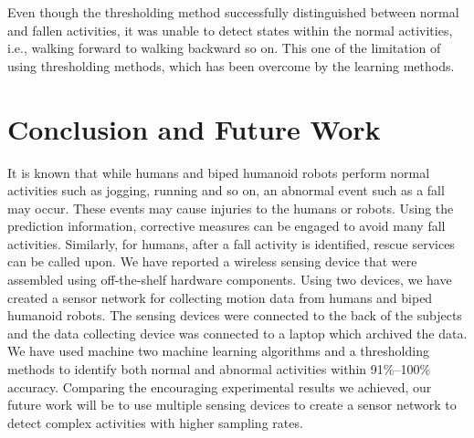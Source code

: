 \documentclass[letterpaper]{article}
\begin{document}
\begin{sloppy}
Even though the thresholding method successfully distinguished between normal and fallen 
activities, it was unable to detect states within the normal activities, i.e., walking forward 
to walking backward so on. This one of the limitation of using thresholding methods, which has 
been overcome by the learning methods. 


\section{Conclusion and Future Work}

It is known that while humans and biped humanoid robots perform normal activities such as jogging, 
running and so on, an abnormal event such as a fall may occur. These events may cause injuries 
 to the humans or robots. 
  Using the prediction information, corrective measures can be engaged to avoid 
 many fall activities. Similarly, for humans, after  a fall activity is identified, rescue services 
 can be called upon. We have reported a wireless sensing device that were assembled using 
off-the-shelf hardware components. Using two devices, we have created a sensor network for 
collecting motion data from humans and biped humanoid robots. The sensing devices were connected to 
the back of the subjects and the data collecting device was connected to a laptop which archived 
the data. We have used machine two machine learning algorithms and a thresholding methods to 
identify both normal and abnormal activities within 91\%--100\% accuracy. Comparing the encouraging 
experimental results we achieved, our future work will be to use multiple sensing devices to create 
a sensor network to detect complex activities with higher sampling rates.  




\end{sloppy}
\end{document}
